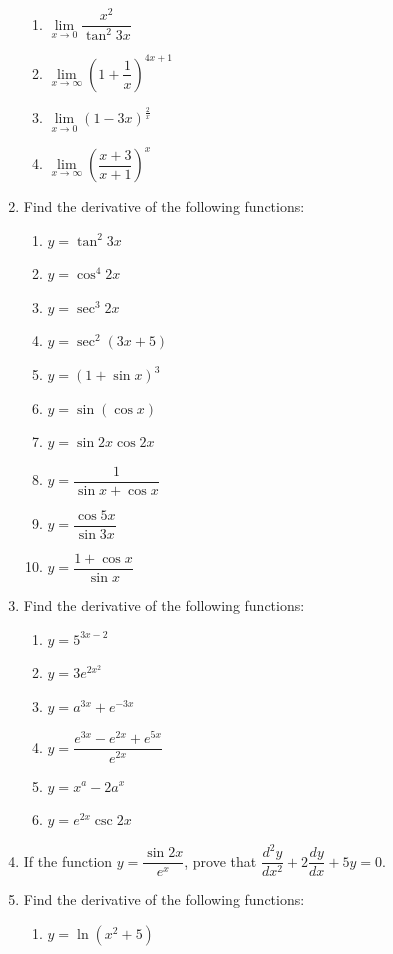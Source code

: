 \documentclass[12pt]{report}
\begin{document}
\begin{enumerate}
\begin{enumerate}
          \item $\lim\limits_{x\to0}\dfrac{x^{2}}{\tan^{2}3x}$
          \item $\lim\limits_{x\to\infty}{\left(1+{\dfrac{1}{x}}\right)}^{4x+1}$
          \item $\lim\limits_{x\to0}{\left(1-3x\right)}^{\frac{2}{x}}$
          \item $\lim\limits_{x\to\infty}{\left({\dfrac{x+3}{x+1}}\right)}^{x}$
        \end{enumerate}
  \item Find the derivative of the following functions:
        \begin{enumerate}
          \item $y=\tan^{2}3x$
          \item $y=\cos^{4}2x$
          \item $y=\sec^{3}2x$
          \item $y=\sec^{2}(3x+5)$
          \item $y={(1+\sin x)}^{3}$
          \item $y=\sin\left(\cos x\right)$
          \item $y=\sin2x\cos2x$
          \item $y={\dfrac{1}{\sin x+\cos x}}$
          \item $y={\dfrac{\cos 5x}{\sin 3x}}$
          \item $y={\dfrac{1+\cos x}{\sin x}}$
        \end{enumerate}
  \item Find the derivative of the following functions:
        \begin{enumerate}
          \item $y=5^{3x-2}$
          \item $y=3e^{2x^{2}}$
          \item $y=a^{3x}+e^{-3x}$
          \item $y={\dfrac{e^{3x}-e^{2x}+e^{5x}}{e^{2x}}}$
          \item $y=x^{a}-2a^{x}$
          \item $y=e^{2x}\csc2x$
        \end{enumerate}
  \item If the function $y = \dfrac{\sin 2x}{e^x}$, prove that $\dfrac{d^2y}{dx^2} +
          2\dfrac{dy}{dx} + 5y = 0$.
  \item Find the derivative of the following functions:
        \begin{enumerate}
          \item $y=\ln\left(x^{2}+5\right)$

\end{enumerate}
\end{enumerate}
\end{document}
